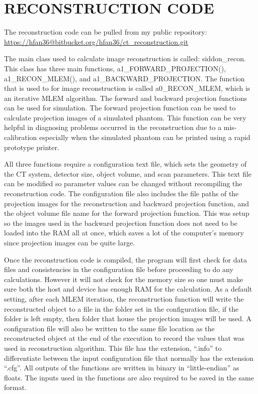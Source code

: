 \chapter{RECONSTRUCTION CODE}\label{app:reconcode}
The reconstruction code can be pulled from my public repository: \url{https://hfan36@bitbucket.org/hfan36/ct_reconstruction.git}

The main class used to calculate image reconstruction is called: siddon\_recon.  This class has three main functions, a1\_FORWARD\_PROJECTION(), a1\_RECON\_MLEM(), and a1\_BACKWARD\_PROJECTION.  The function that is used to for image reconstruction is called a0\_RECON\_MLEM, which is an iterative MLEM algorithm.  The forward and backward projection functions can be used for simulation.  The forward projection function can be used to calculate projection images of a simulated phantom.  This function can be very helpful in diagnosing problems occurred in the reconstruction due to a mis-calibration especially when the simulated phantom can be printed using a rapid prototype printer.

All three functions require a configuration text file, which sets the geometry of the CT system, detector size, object volume, and scan parameters.  This text file can be modified so parameter values can be changed without recompiling the reconstruction code.  The configuration file also includes the file paths of the projection images for the reconstruction and backward projection function, and the object volume file name for the forward projection function.  This was setup so the images used in the backward projection function does not need to be loaded into the RAM all at once, which saves a lot of the computer's memory since projection images can be quite large.

Once the reconstruction code is compiled, the program will first check for data files and consistencies in the configuration file before proceeding to do any calculations.  However it will not check for the memory size so one must make sure both the host and device has enough RAM for the calculation.  As a default setting, after each MLEM iteration, the reconstruction function will write the reconstructed object to a file in the folder set in the configuration file, if the folder is left empty, then folder that house the projection images will be used.  A configuration file will also be written to the same file location as the reconstructed object at the end of the execution to record the values that was used in reconstruction algorithm.  This file has the extension, ``.info'' to differentiate between the input configuration file that normally has the extension ``.cfg''.  All outputs of the functions are written in binary in ``little-endian'' as floats.  The inputs used in the functions are also required to be saved in the same format.

